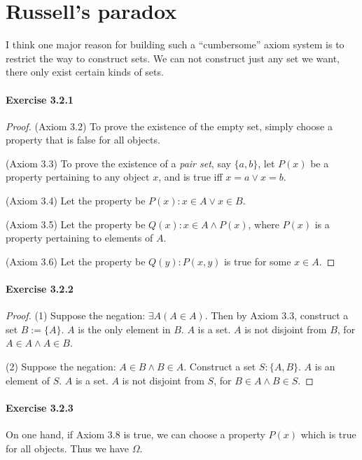 \section{Russell's paradox}
I think one major reason for building such a ``cumbersome'' axiom system is to restrict the way to 
construct sets. We can not construct just any set we want, there only exist certain kinds of sets.

\paragraph{Exercise 3.2.1} \label{exercise3.2.1}
\begin{proof}
(Axiom 3.2) To prove the existence of the empty set, simply choose a property that is false for all 
objects.

(Axiom 3.3) To prove the existence of a \emph{pair set}, say $\{a,b\}$, let $P(x)$ be a property 
pertaining to any object $x$, and is true iff $x = a \vee x = b$.

(Axiom 3.4) Let the property be $P(x): x \in A \vee x \in B$.

(Axiom 3.5) Let the property be $Q(x): x \in A \wedge P(x)$, where $P(x)$ is a property pertaining to 
elements of $A$.

(Axiom 3.6) Let the property be $Q(y): P(x,y)$ is true for some $x \in A$.
\end{proof}

\paragraph{Exercise 3.2.2} \label{exercise3.2.2}
\begin{proof}
(1)
Suppose the negation: $\exists A(A \in A)$. Then by Axiom 3.3, construct a set $B:= \{A\}$. $A$ is 
the only element in $B$. $A$ is a set. $A$ is not disjoint from $B$, for $A \in A \wedge A \in B$. 

(2)
Suppose the negation: $A \in B \wedge B \in A$. Construct a set $S: \{A,B\}$. $A$ is an element of 
$S$. $A$ is a set. $A$ is not disjoint from $S$, for $B \in A \wedge B \in S$.
\end{proof}

\paragraph{Exercise 3.2.3} \label{exercise3.2.3}
On one hand, if Axiom 3.8 is true, we can choose a property $P(x)$ which is true for all objects. Thus 
we have $\Omega$.

